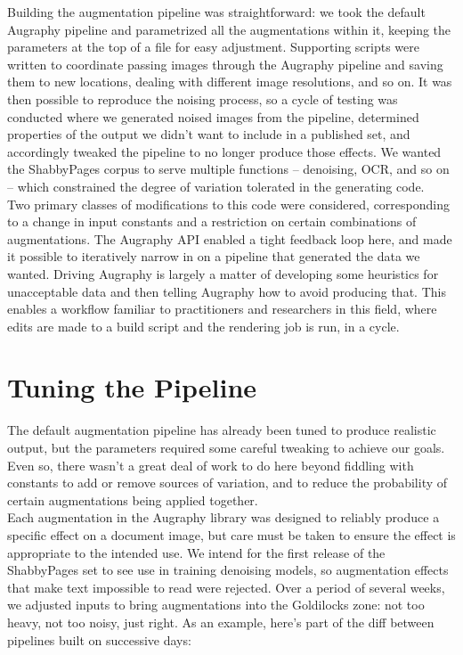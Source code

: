 \documentclass[runningheads]{llncs}
\begin{document}
Building the augmentation pipeline was straightforward: we took the default Augraphy pipeline and parametrized all the augmentations within it, keeping the parameters at the top of a file for easy adjustment. Supporting scripts were written to coordinate passing images through the Augraphy pipeline and saving them to new locations, dealing with different image resolutions, and so on. It was then possible to reproduce the noising process, so a cycle of testing was conducted where we generated noised images from the pipeline, determined properties of the output we didn't want to include in a published set, and accordingly tweaked the pipeline to no longer produce those effects. We wanted the ShabbyPages corpus to serve multiple functions -- denoising, OCR, and so on -- which constrained the degree of variation tolerated in the generating code.\\

Two primary classes of modifications to this code were considered, corresponding to a change in input constants and a restriction on certain combinations of augmentations. The Augraphy API enabled a tight feedback loop here, and made it possible to iteratively narrow in on a pipeline that generated the data we wanted. Driving Augraphy is largely a matter of developing some heuristics for unacceptable data and then telling Augraphy how to avoid producing that. This enables a workflow familiar to practitioners and researchers in this field, where edits are made to a build script and the rendering job is run, in a cycle.

\section{Tuning the Pipeline}
The default augmentation pipeline has already been tuned to produce realistic output, but the parameters required some careful tweaking to achieve our goals. Even so, there wasn't a great deal of work to do here beyond fiddling with constants to add or remove sources of variation, and to reduce the probability of certain augmentations being applied together.\\

Each augmentation in the Augraphy library was designed to reliably produce a specific effect on a document image, but care must be taken to ensure the effect is appropriate to the intended use. We intend for the first release of the ShabbyPages set to see use in training denoising models, so augmentation effects that make text impossible to read were rejected. Over a period of several weeks, we adjusted inputs to bring augmentations into the Goldilocks zone: not too heavy, not too noisy, just right. As an example, here's part of the diff between pipelines built on successive days:
\end{document}
